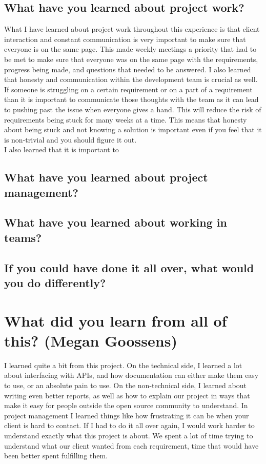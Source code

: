 \documentclass[draftclsnofoot,10pt,onecolumn]{IEEEtran} %
\begin{document}
\subsection{What have you learned about project work?}

What I have learned about project work throughout this experience is that client interaction and constant communication is
very important to make sure that everyone is on the same page. This made weekly meetings a priority that had to be met to 
make sure that everyone was on the same page with the requirements, progress being made, and questions that needed to be
answered. I also learned that honesty and communication within the development team is crucial as well. If someone is struggling
on a certain requirement or on a part of a requirement than it is important to communicate those thoughts with the team as 
it can lead to pushing past the issue when everyone gives a hand. This will reduce the risk of requirements being stuck for
many weeks at a time. This means that honesty about being stuck and not knowing a solution is important even if you feel that
it is non-trivial and you should figure it out. \\

I also learned that it is important to \\

\subsection{What have you learned about project management?}

\subsection{What have you learned about working in teams?}

\subsection{If you could have done it all over, what would you do differently?}


\section{What did you learn from all of this? (Megan Goossens)}
I learned quite a bit from this project. On the technical side, I learned a lot
about interfacing with APIs, and how documentation can either make them easy to
use, or an absolute pain to use. On the non-technical side, I learned about
writing even better reports, as well as how to explain our project in ways that
make it easy for people outside the open source community to understand.  In
project management I learned things like how frustrating it can be when your
client is hard to contact. If I had to do it all over again, I would work harder
to understand exactly what this project is about. We spent a lot of time trying
to understand what our client wanted from each requirement, time that would have
been better spent fulfilling them.
\end{document}
